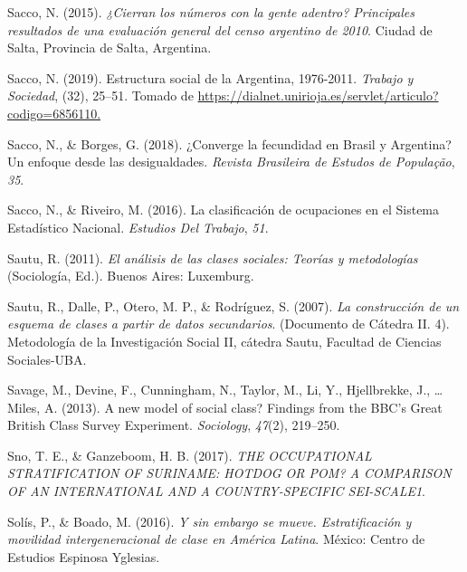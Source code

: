 \documentclass[
]{article}
\newlength{\cslhangindent}
\newlength{\cslentryspacingunit} %
\newenvironment{CSLReferences}[2] %
 {%
  \setlength{\parindent}{0pt}
  \ifodd #1
  \let\oldpar\par
  \def\par{\hangindent=\cslhangindent\oldpar}
  \fi
  \setlength{\parskip}{#2\cslentryspacingunit}
 }%
 {}
\begin{document}
\begin{CSLReferences}{1}{0}
\leavevmode{}%
Sacco, N. (2015). \emph{¿{Cierran} los números con la gente adentro? {Principales} resultados de una evaluación general del censo argentino de 2010}. Ciudad de Salta, Provincia de Salta, Argentina.

\leavevmode{}%
Sacco, N. (2019). Estructura social de la {Argentina}, 1976-2011. \emph{Trabajo y Sociedad}, (32), 25--51. Tomado de \href{https://dialnet.unirioja.es/servlet/articulo?codigo=6856110}{https://dialnet.unirioja.es/servlet/articulo?codigo=6856110.}

\leavevmode{}%
Sacco, N., \& Borges, G. (2018). ¿{Converge} la fecundidad en {Brasil} y {Argentina}? {Un} enfoque desde las desigualdades. \emph{Revista Brasileira de Estudos de População}, \emph{35}.

\leavevmode{}%
Sacco, N., \& Riveiro, M. (2016). La clasificación de ocupaciones en el {Sistema} {Estadístico} {Nacional}. \emph{Estudios Del Trabajo}, \emph{51}.

\leavevmode{}%
Sautu, R. (2011). \emph{El análisis de las clases sociales: Teorías y metodologías} (Sociología, Ed.). Buenos Aires: Luxemburg.

\leavevmode{}%
Sautu, R., Dalle, P., Otero, M. P., \& Rodríguez, S. (2007). \emph{La construcción de un esquema de clases a partir de datos secundarios}. (Documento de Cátedra II. 4). Metodología de la Investigación Social II, cátedra Sautu, Facultad de Ciencias Sociales-UBA.

\leavevmode{}%
Savage, M., Devine, F., Cunningham, N., Taylor, M., Li, Y., Hjellbrekke, J., \ldots{} Miles, A. (2013). A new model of social class? {Findings} from the {BBC}'s {Great} {British} {Class} {Survey} {Experiment}. \emph{Sociology}, \emph{47}(2), 219--250.

\leavevmode{}%
Sno, T. E., \& Ganzeboom, H. B. (2017). \emph{{THE} {OCCUPATIONAL} {STRATIFICATION} {OF} {SURINAME}: {HOTDOG} {OR} {POM}? {A} {COMPARISON} {OF} {AN} {INTERNATIONAL} {AND} {A} {COUNTRY}-{SPECIFIC} {SEI}-{SCALE1}}.

\leavevmode{}%
Solís, P., \& Boado, M. (2016). \emph{Y sin embargo se mueve. {Estratificación} y movilidad intergeneracional de clase en {América} {Latina}}. México: Centro de Estudios Espinosa Yglesias.


\end{CSLReferences}
\end{document}
